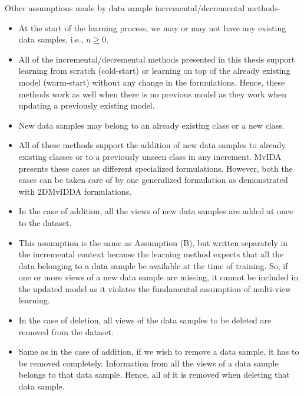 \noindent
Other assumptions made by data sample incremental/decremental methods-
\begin{itemize}
	\item[a)] At the start of the learning process, we may or may not have any existing data samples, i.e., $n \geqslant 0$. 
	\item[-] All of the incremental/decremental methods presented in this thesis support learning from scratch (cold-start) or learning on top of the already existing model (warm-start) without any change in the formulations. Hence, these methods work as well when there is no previous model as they work when updating a previously existing model.
	
	\item[b)] New data samples may belong to an already existing class or a new class.
	\item[-] All of these methods support the addition of new data samples to already existing classes or to a previously unseen class in any increment. MvIDA presents these cases as different specialized formulations. However, both the cases can be taken care of by one generalized formulation as demonstrated with 2DMvIDDA formulations.
	
	\item[c)] In the case of addition, all the views of new data samples are added at once to the dataset.
	\item[-] This assumption is the same as Assumption (B), but written separately in the incremental context because the learning method expects that all the data belonging to a data sample be available at the time of training. So, if one or more views of a new data sample are missing, it cannot be included in the updated model as it violates the fundamental assumption of multi-view learning.
	
	\item[d)] In the case of deletion, all views of the data samples to be deleted are removed from the dataset.
	\item[-] Same as in the case of addition, if we wish to remove a data sample, it has to be removed completely. Information from all the views of a data sample belongs to that data sample. Hence, all of it is removed when deleting that data sample.
	
\end{itemize}

